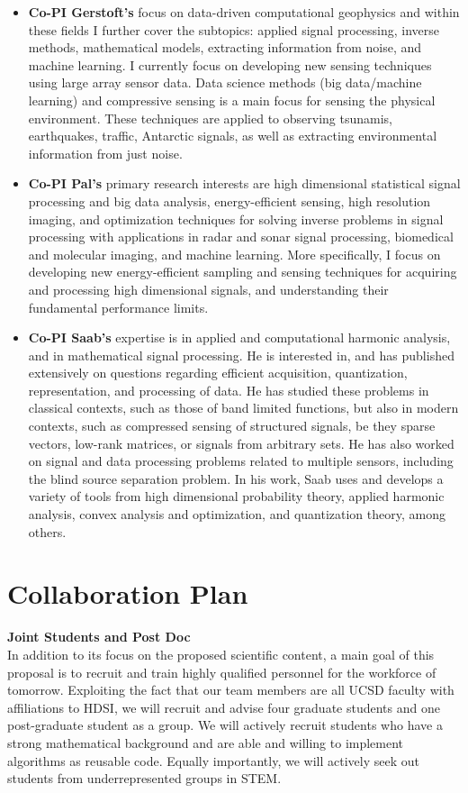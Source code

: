 \documentclass{article}
\begin{document}
\begin{itemize}
\item {\bf Co-PI Gerstoft's} focus on data-driven computational geophysics and within these fields I further cover the subtopics: applied signal processing, inverse methods, mathematical models, extracting information from noise, and machine learning. I currently focus on developing new sensing techniques using large array sensor data. Data science methods (big data/machine learning) and compressive sensing is a main focus for sensing the physical environment.  These techniques are applied to observing tsunamis, earthquakes, traffic, Antarctic signals, as well as extracting environmental information from just noise. 
\item {\bf Co-PI Pal's}  primary research interests are high dimensional statistical signal processing and big data analysis, energy-efficient sensing, high resolution imaging, and optimization techniques for solving inverse problems in signal processing with applications in radar and sonar signal processing, biomedical and molecular imaging, and machine learning. More specifically, I focus on developing new energy-efficient sampling and sensing techniques for acquiring and processing high dimensional signals, and understanding their fundamental performance limits. 
\item {\bf Co-PI Saab's} expertise is in applied and computational harmonic analysis, and in mathematical signal processing. He is interested in, and has published extensively on questions regarding efficient acquisition, quantization, representation, and processing of data. He has studied these problems in classical contexts, such as those of band limited functions, but also in modern contexts, such as compressed sensing of structured signals, be they sparse vectors, low-rank matrices, or signals from arbitrary sets. He has also worked on signal and data processing problems related to multiple sensors, including the blind source separation problem. In his work, Saab uses and develops a variety of tools from high dimensional probability theory, applied harmonic analysis, convex analysis and optimization, and quantization theory, among others. 
\end{itemize}
\vspace{1cm}

\section{Collaboration Plan}
\iffalse


{\bf Joint Students and Post Doc}\\
 In
addition to its focus on the proposed scientific content, a main goal
of this proposal is to recruit and train highly qualified personnel
for the workforce of tomorrow. Exploiting the fact that our team
members are all UCSD faculty with affiliations to HDSI, we will
recruit and advise four graduate students and one post-graduate student as a group. We
will actively recruit students who have a strong mathematical
background and are able and willing to implement algorithms as
reusable code. Equally importantly, we will actively seek out students
from underrepresented groups in STEM.
\end{document}
